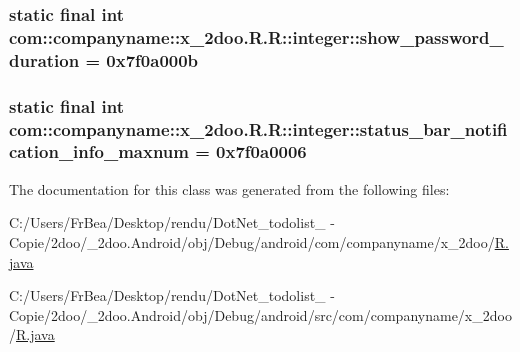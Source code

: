 \hypertarget{classcom_1_1companyname_1_1x__2doo_1_1_r_1_1integer_41a2a0065b028acae42a82dd47b676a2}{
\subsubsection[{show\_\-password\_\-duration}]{\setlength{\rightskip}{0pt plus 5cm}static final int com::companyname::x\_\-2doo.R.R::integer::show\_\-password\_\-duration = 0x7f0a000b}}
\label{classcom_1_1companyname_1_1x__2doo_1_1_r_1_1integer_41a2a0065b028acae42a82dd47b676a2}


\hypertarget{classcom_1_1companyname_1_1x__2doo_1_1_r_1_1integer_82627f137faffabd171c6c8451882ff5}{
\subsubsection[{status\_\-bar\_\-notification\_\-info\_\-maxnum}]{\setlength{\rightskip}{0pt plus 5cm}static final int com::companyname::x\_\-2doo.R.R::integer::status\_\-bar\_\-notification\_\-info\_\-maxnum = 0x7f0a0006}}
\label{classcom_1_1companyname_1_1x__2doo_1_1_r_1_1integer_82627f137faffabd171c6c8451882ff5}




The documentation for this class was generated from the following files:\begin{CompactItemize}
\item 
C:/Users/FrBea/Desktop/rendu/DotNet\_\-todolist\_ - Copie/2doo/\_\-2doo.Android/obj/Debug/android/com/companyname/x\_\-2doo/\hyperlink{com_2companyname_2x__2doo_2_r_8java}{R.java}\item 
C:/Users/FrBea/Desktop/rendu/DotNet\_\-todolist\_ - Copie/2doo/\_\-2doo.Android/obj/Debug/android/src/com/companyname/x\_\-2doo/\hyperlink{src_2com_2companyname_2x__2doo_2_r_8java}{R.java}\end{CompactItemize}
